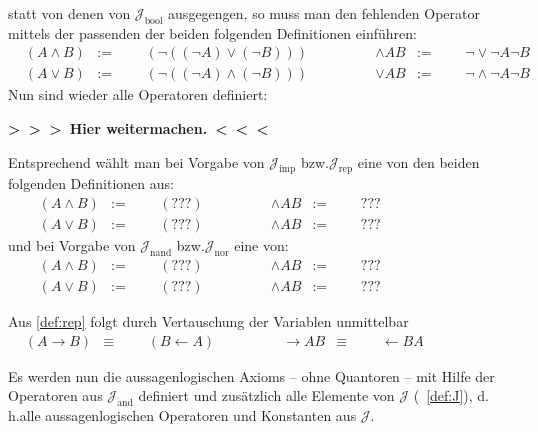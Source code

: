 \documentclass[english,ngerman,parskip=half,headsepline,footsepline,
	fleqn,notitlepage]{scrreprt}
\makeatletter
\newcommand*{\defeq}{:=}%
\newcommand*{\lrep}{\leftarrow}%
\newcommand*{\limp}{\rightarrow}%
\newcommand*{\asJ}{\mathcal{J}}%
\newcommand*{\xAnd}{\mathrm{and}}%
\newcommand*{\xBool}{\mathrm{bool}}%
\newcommand*{\xImp}{\mathrm{imp}}%
\newcommand*{\xNand}{\mathrm{nand}}%
\newcommand*{\xNor}{\mathrm{nor}}%
\newcommand*{\xRep}{\mathrm{rep}}%
\newcommand*{\formulatoleft}{&&&&&&&&&&}%
\newcommand*{\formulaspace}{&&&&}%
\newcommand*{\todo}[1]{\textbf{>~>~>~#1~<~<~<}}%
\newcommand*{\textbzw}{bzw.\@ }
\newcommand*{\textdh}{d.\@\,h.\@ }
\newcommand*{\glsIdxPl}[1]{\glspl{#1}\idx{\gls{#1}}}%
\makeatother
\begin{document}
	statt von denen von $\asJ_\xBool$ ausgegengen,
	so muss man den fehlenden Operator mittels
	der passenden der beiden folgenden Definitionen einführen:
	\begin{align}
		&         (A \land B) & \defeq & & & (\lnot ((\lnot A) \lor (\lnot B)))
		& \formulaspace &    \land A B &\defeq & & & \lnot \lor \lnot A \lnot B
		\label{def:and}
		\\
		&          (A \lor B) & \defeq & & & (\lnot ((\lnot A) \land (\lnot B)))
		& \formulaspace &    \lor A B &\defeq & & & \lnot \land \lnot A \lnot B
		\label{def:or}
		\formulatoleft
	\end{align}
	Nun sind wieder alle Operatoren definiert:

\todo{Hier weitermachen.}%

	Entsprechend wählt man bei Vorgabe von $\asJ_\xImp$ \textbzw $\asJ_\xRep$
	eine von den beiden folgenden Definitionen aus:
	\begin{align}
		&             (A \land B) & \defeq & & & (???)
		& \formulaspace &    \land A B &\defeq & & & ???
		\label{def:and2}
		\\
		&              (A \lor B) & \defeq & & & (???)
		& \formulaspace &    \land A B &\defeq & & & ???
		\label{def:or2}
		\formulatoleft
	\end{align}
	und bei Vorgabe von $\asJ_\xNand$ \textbzw $\asJ_\xNor$
	eine von:
	\begin{align}
	&             (A \land B) & \defeq & & & (???)
	& \formulaspace &    \land A B &\defeq & & & ???
	\label{def:and3}
	\\
	&              (A \lor B) & \defeq & & & (???)
	& \formulaspace &    \land A B &\defeq & & & ???
	\label{def:or3}
	\formulatoleft
	\end{align}

	Aus \ref{def:rep} folgt durch Vertauschung der Variablen unmittelbar
	\begin{align}
		&                 (A \limp B) & \equiv & & & (B \lrep A)
		& \formulaspace &   \limp A B & \equiv & & & \lrep B A
		\label{eq:imp}   \formulatoleft
	\end{align}

	Es werden nun die aussagenlogischen \glsIdxPl{Axiom}
	-- ohne Quantoren --
	mit Hilfe der Operatoren aus $\asJ_\xAnd$ definiert
	und zusätzlich alle Elemente von $\asJ$ (\seename~\vref{def:J}),
	\textdh alle aussagenlogischen Operatoren und Konstanten aus $\asJ$.
\end{document}
